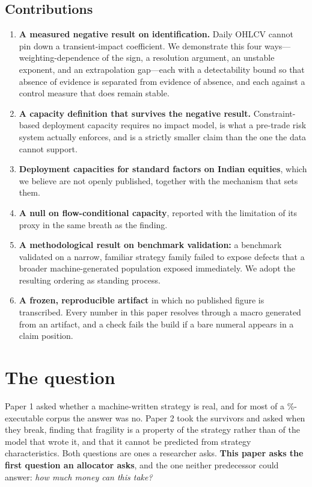 \documentclass[11pt,a4paper]{article}
\begin{document}
\subsection*{Contributions}
\begin{enumerate}
\item \textbf{A measured negative result on identification.} Daily OHLCV cannot pin down a
transient-impact coefficient. We demonstrate this four ways---weighting-dependence of the sign, a
resolution argument, an unstable exponent, and an extrapolation gap---each with a detectability
bound so that absence of evidence is separated from evidence of absence, and each against a control
measure that does remain stable.
\item \textbf{A capacity definition that survives the negative result.} Constraint-based deployment
capacity requires no impact model, is what a pre-trade risk system actually enforces, and is a
strictly smaller claim than the one the data cannot support.
\item \textbf{Deployment capacities for standard factors on Indian equities}, which we believe are
not openly published, together with the mechanism that sets them.
\item \textbf{A null on flow-conditional capacity}, reported with the limitation of its proxy in the
same breath as the finding.
\item \textbf{A methodological result on benchmark validation:} a benchmark validated on a narrow,
familiar strategy family failed to expose defects that a broader machine-generated population
exposed immediately. We adopt the resulting ordering as standing process.
\item \textbf{A frozen, reproducible artifact} in which no published figure is transcribed. Every
number in this paper resolves through a macro generated from an artifact, and a check fails the
build if a bare numeral appears in a claim position.
\end{enumerate}

\section{The question}
\label{sec:question}

Paper 1 asked whether a machine-written strategy is real, and for most of a \pgmLocalTrade\%-%
executable corpus the answer was no. Paper 2 took the survivors and asked when they break,
finding that fragility is a property of the strategy rather than of the model that wrote it, and
that it cannot be predicted from strategy characteristics. Both questions are ones a researcher
asks. \textbf{This paper asks the first question an allocator asks}, and the one neither
predecessor could answer: \emph{how much money can this take?}
\end{document}
